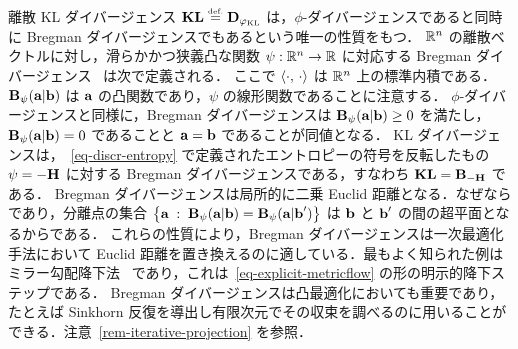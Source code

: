 \begin{remark}\label{rem-bregman}
離散 KL ダイバージェンス $\mathrm{\textbf{KL}} \stackrel{\mbox{\upshape\tiny def.}}{=} \mathrm{\textbf{D}}_{\varphi_{\operatorname{KL}}}$ は，$\phi$-ダイバージェンスであると同時に Bregman ダイバージェンスでもあるという唯一の性質をもつ．
%
$\mathbb{R}^n$ の離散ベクトルに対し，滑らかかつ狭義凸な関数 $\psi : \mathbb{R}^n \rightarrow \mathbb{R}$ に対応する Bregman ダイバージェンス~\citep{bregman1967relaxation} は次で定義される．
ここで $\langle \cdot,\,\cdot\rangle$ は $\mathbb{R}^n$ 上の標準内積である．$\mathrm{\textbf{B}}_\psi(\mathrm{\textbf{a}}|\mathrm{\textbf{b}})$ は $\mathrm{\textbf{a}}$ の凸関数であり，$\psi$ の線形関数であることに注意する．
%
$\phi$-ダイバージェンスと同様に，Bregman ダイバージェンスは $\mathrm{\textbf{B}}_\psi(\mathrm{\textbf{a}}|\mathrm{\textbf{b}}) \geq 0$ を満たし，$\mathrm{\textbf{B}}_\psi(\mathrm{\textbf{a}}|\mathrm{\textbf{b}})=0$ であることと $\mathrm{\textbf{a}}=\mathrm{\textbf{b}}$ であることが同値となる．
%
KL ダイバージェンスは，~\eqref{eq-discr-entropy} で定義されたエントロピーの符号を反転したもの $\psi = -\mathrm{\textbf{H}}$ に対する Bregman ダイバージェンスである，すなわち $\mathrm{\textbf{KL}} = \mathrm{\textbf{B}}_{-\mathrm{\textbf{H}}}$ である．
%
Bregman ダイバージェンスは局所的に二乗 Euclid 距離となる．なぜなら
であり，分離点の集合 $\left\{ \mathrm{\textbf{a}} \;:\; \mathrm{\textbf{B}}_\psi(\mathrm{\textbf{a}}|\mathrm{\textbf{b}}) = \mathrm{\textbf{B}}_\psi(\mathrm{\textbf{a}}|\mathrm{\textbf{b}}') \right\}$ は $\mathrm{\textbf{b}}$ と $\mathrm{\textbf{b}}'$ の間の超平面となるからである．
%
これらの性質により，Bregman ダイバージェンスは一次最適化手法において Euclid 距離を置き換えるのに適している．最もよく知られた例はミラー勾配降下法~\citep{beck2003mirror} であり，これは~\eqref{eq-explicit-metricflow} の形の明示的降下ステップである．
%
Bregman ダイバージェンスは凸最適化においても重要であり，たとえば Sinkhorn 反復を導出し有限次元でその収束を調べるのに用いることができる．注意~\ref{rem-iterative-projection} を参照．
\end{remark}

